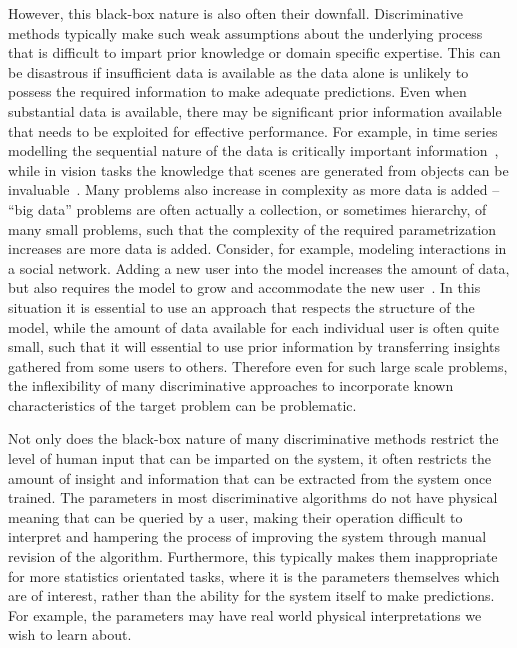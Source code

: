 However, this black-box nature is also often their downfall.  Discriminative methods typically make
such weak assumptions about the underlying process that is difficult to impart prior knowledge
or domain specific expertise.  This can be disastrous if insufficient data is available as the data
alone is unlikely to possess the required information to make adequate predictions.  Even when
substantial data is available, there may be significant prior information available that needs to be
exploited for effective performance.  For example, in time series modelling the sequential nature
of the data is critically important information~\citep{liu1998sequential}, while in vision tasks the 
knowledge that scenes are generated from objects can be invaluable~\citep{kulkarni2015picture}.
Many problems also increase in complexity as more data is added -- ``big data'' problems are often
actually a collection, or sometimes hierarchy, of many small problems, such that the complexity of the
required parametrization increases are more data is added.  Consider, for example, modeling interactions in
a social network.  Adding a new user into the model increases the amount of data, but also
requires the model to grow and accommodate the new user~\citep{ravasz2003hierarchical}.  In
this situation it is essential to
use an approach that respects the structure of the model, while the amount of data available
for each individual user is often quite small, such that it will essential to use prior information
by transferring insights gathered from some users to others.  Therefore even for such large scale
problems, the inflexibility of many discriminative approaches to incorporate known characteristics
of the target problem can be problematic.

Not only does the black-box nature of many discriminative methods restrict the level of
human input that can be imparted on the system, it often restricts the amount of insight
and information that can be extracted from the system once trained.  The parameters in most discriminative
algorithms do not have physical meaning that can be queried by a user, making their operation
difficult to interpret and hampering the process of improving the system through manual
revision of the algorithm.  Furthermore, this typically makes them inappropriate for more
statistics orientated tasks, where it is the parameters themselves which are of interest, rather
than the ability for the system itself to make predictions.  For example, the parameters may
have real world physical interpretations we wish to learn about.

